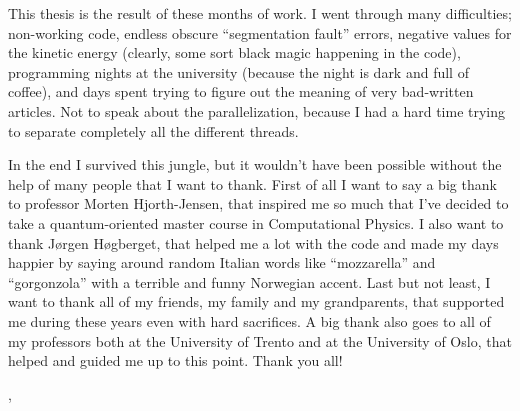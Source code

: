 This thesis is the result of these months of work. I went through many difficulties; non-working code, endless obscure ``segmentation fault'' errors, negative values for the kinetic energy (clearly, some sort black magic happening in the code), programming nights at the university (because the night is dark and full of coffee), and days spent trying to figure out the meaning of very bad-written articles. Not to speak about the parallelization, because I had a hard time trying to separate completely all the different threads.

In the end I survived this jungle, but it wouldn't have been possible without the help of many people that I want to thank. First of all I want to say a big thank to professor Morten Hjorth-Jensen, that inspired me so much that I've decided to take a quantum-oriented master course in Computational Physics. I also want to thank Jørgen Høgberget, that helped me a lot with the code and made my days happier by saying around random Italian words like ``mozzarella'' and ``gorgonzola'' with a terrible and funny Norwegian accent. Last but not least, I want to thank all of my friends, my family and my grandparents, that supported me during these years even with hard sacrifices. A big thank also goes to all of my professors both at the University of Trento and at the University of Oslo, that helped and guided me up to this point. Thank you all!

\begin{flushright}
	{ \THauthor }
\end{flushright}
\begin{flushleft}
	{ \THplace, \THdate }
\end{flushleft}


